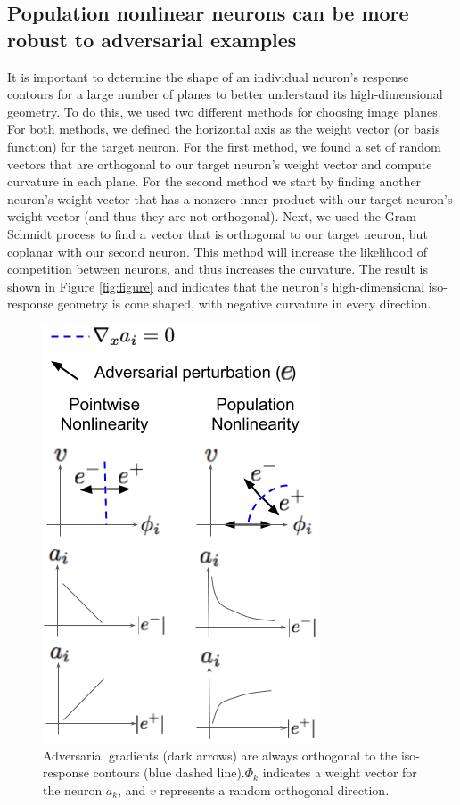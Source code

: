 \subsection{Population nonlinear neurons can be more robust to adversarial examples}
It is important to determine the shape of an individual neuron’s response contours for a large number of planes to better understand its high-dimensional geometry.  To do this, we used two different methods for choosing image planes. For both methods, we defined the horizontal axis as the weight vector (or basis function) for the target neuron. For the first method, we found a set of random vectors that are orthogonal to our target neuron’s weight vector and compute curvature in each plane. For the second method we start by finding another neuron’s weight vector that has a nonzero inner-product with our target neuron’s weight vector (and thus they are not orthogonal). Next, we used the Gram-Schmidt process to find a vector that is orthogonal to our target neuron, but coplanar with our second neuron. This method will increase the likelihood of competition between neurons, and thus increases the curvature. The result is shown in Figure \ref{fig:figure} and indicates that the neuron’s high-dimensional iso-response geometry is cone shaped, with negative curvature in every direction.

\begin{figure}[h]
\begin{center}
\centerline{\includegraphics[width=0.5\columnwidth]{Figures/adversarial_gradients_iso_contours.png}}
\end{center}
\caption{Adversarial gradients (dark arrows) are always orthogonal to the iso-response contours (blue dashed line).$\Phi_{k}$ indicates a weight vector for the neuron $a_{k}$, and $v$ represents a random orthogonal direction.}
\label{fig:adv_grads}
\end{figure}

